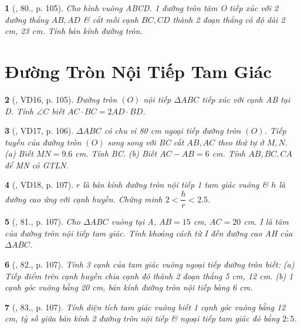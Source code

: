 \documentclass{article}
\newtheorem{baitoan}{}
\begin{document}
\begin{baitoan}[\cite{Binh_Toan_9_tap_1}, 80., p. 105]
	Cho hình vuông ABCD. 1 đường tròn tâm O tiếp xúc với 2 đường thẳng $AB,AD$ \& cắt mỗi cạnh $BC,CD$ thành 2 đoạn thẳng có độ dài {\rm2 cm, 23 cm}. Tính bán kính đường tròn.
\end{baitoan}


\section{Đường Tròn Nội Tiếp Tam Giác}

\begin{baitoan}[\cite{Binh_Toan_9_tap_1}, VD16, p. 105]
	Đường tròn $(O)$ nội tiếp $\Delta ABC$ tiếp xúc với cạnh AB tại D. Tính $\angle{C}$ biết $AC\cdot BC = 2AD\cdot BD$.
\end{baitoan}

\begin{baitoan}[\cite{Binh_Toan_9_tap_1}, VD17, p. 106]
	$\Delta ABC$ có chu vi {\rm80 cm} ngoại tiếp đường tròn $(O)$. Tiếp tuyến của đường tròn $(O)$ song song với BC cắt $AB,AC$ theo thứ tự ở $M,N$. (a) Biết $MN = 9.6$ {\rm cm}. Tính BC. (b) Biết $AC - AB = 6$ {\rm cm}. Tính $AB,BC,CA$ để MN có {\rm GTLN}.
\end{baitoan}

\begin{baitoan}[\cite{Binh_Toan_9_tap_1}, VD18, p. 107]
	$r$ là bán kính đường tròn nội tiếp 1 tam giác vuông \& $h$ là đường cao ứng với cạnh huyền. Chứng minh $2 < \dfrac{h}{r} < 2.5$.
\end{baitoan}

\begin{baitoan}[\cite{Binh_Toan_9_tap_1}, 81., p. 107]
	Cho $\Delta ABC$ vuông tại A, $AB = 15$ {\rm cm}, $AC = 20$ {\rm cm}. I là tâm của đường tròn nội tiếp tam giác. Tính khoảng cách từ I đến đường cao AH của $\Delta ABC$. 
\end{baitoan}

\begin{baitoan}[\cite{Binh_Toan_9_tap_1}, 82., p. 107]
	Tính 3 cạnh của tam giác vuông ngoại tiếp đường tròn biết: (a) Tiếp điểm trên cạnh huyền chia cạnh đó thành 2 đoạn thẳng {\rm5 cm, 12 cm}. (b) 1 cạnh góc vuông bằng {\rm20 cm}, bán kính đường tròn nội tiếp bàng {\rm6 cm}.
\end{baitoan}

\begin{baitoan}[\cite{Binh_Toan_9_tap_1}, 83., p. 107]
	Tính diện tích tam giác vuông biết 1 cạnh góc vuông bằng {\rm12 cm}, tỷ số giữa bán kính 2 đường tròn nội tiếp \& ngoại tiếp tam giác đó bằng $2:5$.
\end{baitoan}
\end{document}
